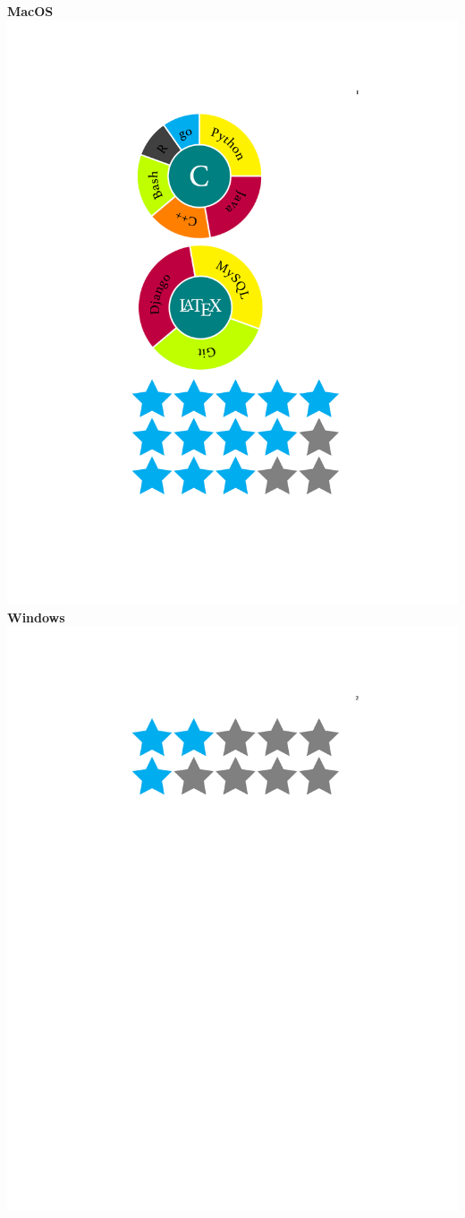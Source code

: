 \documentclass[]{friggeri-cv}
\begin{document}
\begin{aside}
    \textbf{MacOS}\includegraphics[scale=0.16]{img/4stars}
    \textbf{Windows}\includegraphics[scale=0.16]{img/2stars}

\end{aside}
\end{document}
